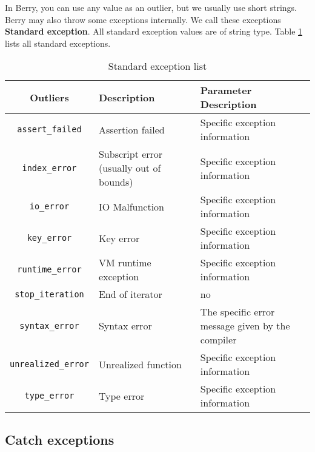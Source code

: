 In Berry, you can use any value as an outlier, but we usually use short strings. Berry may also throw some exceptions internally. We call these exceptions \textbf{Standard exception}. All standard exception values   are of string type. Table \ref{tab::stdexpect_list} lists all standard exceptions.
\begin{table}[htb]
    \centering
    \setlength{\tabcolsep}{3mm}
    \begin{tabular}{cll} \toprule
        \textbf{Outliers} & \textbf{Description} & \textbf{Parameter Description} \\ \midrule
        \texttt{assert\_failed} & Assertion failed & Specific exception information \\
        \texttt{index\_error} & Subscript error (usually out of bounds) & Specific exception information \\
        \texttt{io\_error} & IO Malfunction & Specific exception information \\
        \texttt{key\_error} & Key error & Specific exception information \\
        \texttt{runtime\_error} & VM runtime exception & Specific exception information \\
        \texttt{stop\_iteration} & End of iterator & no \\
        \texttt{syntax\_error} & Syntax error & The specific error message given by the compiler \\
        \texttt{unrealized\_error} & Unrealized function & Specific exception information \\
        \texttt{type\_error} & Type error & Specific exception information \\
        \bottomrule
    \end{tabular}
    \caption{Standard exception list}
    \label{tab::stdexpect_list}
\end{table}

\subsection {Catch exceptions}

